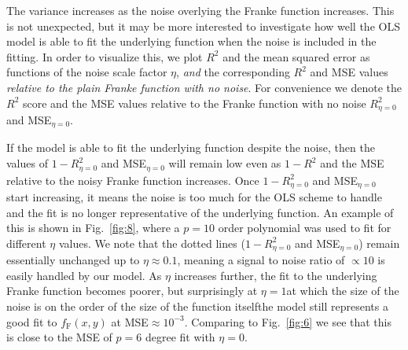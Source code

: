 \documentclass[a4paper]{article}
\newcommand{\fig}[1]{Fig.\ \ref{fig:#1}}
\begin{document}
\begin{multicols}{2}
The variance increases as the noise overlying the Franke function increases. This is not unexpected, but it may be more interested to investigate how well the OLS model is able to fit the underlying function when the noise is included in the fitting. In order to visualize this, we plot $R^2$ and the mean squared error as functions of the noise scale factor $\eta$, \textit{and} the corresponding $R^2$ and MSE values \textit{relative to the plain Franke function with no noise}. For convenience we denote the $R^2$ score and the MSE values relative to the Franke function with no noise $R^2_{\eta=0}$ and MSE$_{\eta=0}$.

If the model is able to fit the underlying function despite the noise, then the values of $1-R^2_{\eta=0}$ and MSE${}_{\eta=0}$ will remain low even as $1-R^2$ and the MSE relative to the noisy Franke function increases. Once $1-R^2_{\eta=0}$ and MSE${}_{\eta=0}$ start increasing, it means the noise is too much for the OLS scheme to handle and the fit is no longer representative of the underlying function. An example of this is shown in \fig{8}, where a $p=10$ order polynomial was used to fit for different $\eta$ values. We note that the dotted lines ($1-R^2_{\eta=0}$ and MSE${}_{\eta=0}$) remain essentially unchanged up to $\eta\approx 0.1$, meaning a signal to noise ratio of $\propto10$ is easily handled by our model. As $\eta$ increases further, the fit to the underlying Franke function becomes poorer, but surprisingly at $\eta=1$\textemdash at which the size of the noise is on the order of the size of the function itself\textemdash the model still represents a good fit to $f_\text{F}(x,y)$ at MSE$\approx10^{-3}$. Comparing to \fig{6} we see that this is close to the MSE of $p=6$ degree fit with $\eta=0$.


\end{multicols}
\end{document}
